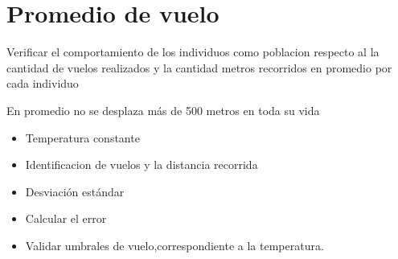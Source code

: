 \section{Promedio de vuelo}
Verificar el comportamiento de los individuos como poblacion respecto al 
la cantidad de vuelos realizados y la cantidad metros recorridos en promedio por cada individuo

En promedio no se desplaza más de 500 metros en toda su vida

\begin{itemize}
    \item Temperatura constante 
    \item Identificacion de vuelos y la distancia recorrida
    \item Desviación estándar
    \item Calcular el error
    \item Validar umbrales de vuelo,correspondiente a la temperatura.
\end{itemize}
